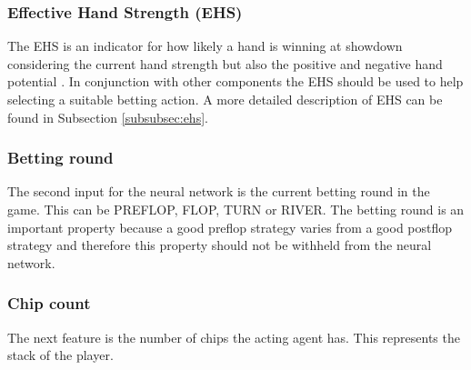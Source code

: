 \subsubsection{Effective Hand Strength (EHS)}
The EHS is an indicator for how likely a hand is winning at showdown considering the current hand strength but also the positive and negative hand potential \cite{evolutionary_methods}. In conjunction with other components the EHS should be used to help selecting a suitable betting action. A more detailed description of EHS can be found in Subsection \ref{subsubsec:ehs}.
\subsubsection{Betting round}
The second input for the neural network is the current betting round in the game. This can be PREFLOP, FLOP, TURN or RIVER. The betting round is an important property because a good preflop strategy varies from a good postflop strategy and therefore this property should not be withheld from the neural network.
\subsubsection{Chip count}
The next feature is the number of chips the acting agent has. This represents the stack of the player. 
